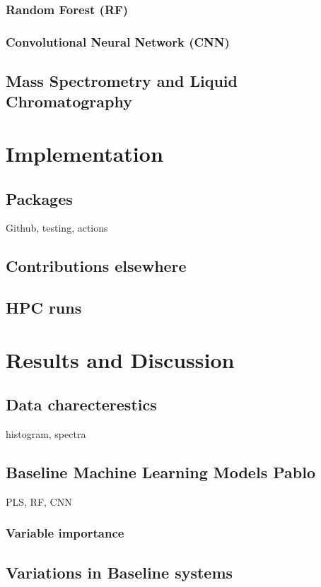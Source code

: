 \documentclass[12pt,a4paper]{report}
\begin{document}
\subsection{Random Forest (RF)}
\subsection{Convolutional Neural Network (CNN)}
\section{Mass Spectrometry and Liquid Chromatography}



\chapter{Implementation}
\section{Packages}
Github, testing, actions
\section{Contributions elsewhere}
\section{HPC runs}


\chapter{Results and Discussion}

\section{Data charecterestics}
histogram, spectra
\section{Baseline Machine Learning Models Pablo}
PLS, RF, CNN

\subsection{Variable importance}

\section{ Variations in Baseline systems}
\end{document}
